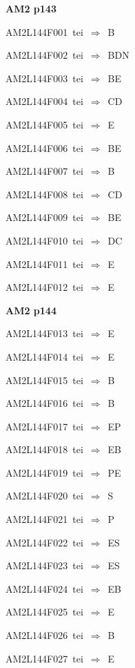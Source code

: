\par\vfill\eject
{\bf\hfill AM2 p143\hfill\hbox{}}\par\bigskip
{\sixrm AM2L144F001\ {\sixit tei}\ }$\Rightarrow$\ {\tenit B}\par\smallskip
{\sixrm AM2L144F002\ {\sixit tei}\ }$\Rightarrow$\ BDN\par\smallskip
{\sixrm AM2L144F003\ {\sixit tei}\ }$\Rightarrow$\ BE\par\smallskip
{\sixrm AM2L144F004\ {\sixit tei}\ }$\Rightarrow$\ CD\par\smallskip
{\sixrm AM2L144F005\ {\sixit tei}\ }$\Rightarrow$\ {\tenit E}\par\smallskip
{\sixrm AM2L144F006\ {\sixit tei}\ }$\Rightarrow$\ BE\par\smallskip
{\sixrm AM2L144F007\ {\sixit tei}\ }$\Rightarrow$\ {\tenit B}\par\smallskip
{\sixrm AM2L144F008\ {\sixit tei}\ }$\Rightarrow$\ CD\par\smallskip
{\sixrm AM2L144F009\ {\sixit tei}\ }$\Rightarrow$\ BE\par\smallskip
{\sixrm AM2L144F010\ {\sixit tei}\ }$\Rightarrow$\ DC\par\smallskip
{\sixrm AM2L144F011\ {\sixit tei}\ }$\Rightarrow$\ {\tenit E}\par\smallskip
{\sixrm AM2L144F012\ {\sixit tei}\ }$\Rightarrow$\ {\tenit E}\par\smallskip

\par\vfill\eject
{\bf\hfill AM2 p144\hfill\hbox{}}\par\bigskip
{\sixrm AM2L144F013\ {\sixit tei}\ }$\Rightarrow$\ E\par\smallskip
{\sixrm AM2L144F014\ {\sixit tei}\ }$\Rightarrow$\ E\par\smallskip
{\sixrm AM2L144F015\ {\sixit tei}\ }$\Rightarrow$\ B\par\smallskip
{\sixrm AM2L144F016\ {\sixit tei}\ }$\Rightarrow$\ B\par\smallskip
{\sixrm AM2L144F017\ {\sixit tei}\ }$\Rightarrow$\ EP\par\smallskip
{\sixrm AM2L144F018\ {\sixit tei}\ }$\Rightarrow$\ EB\par\smallskip
{\sixrm AM2L144F019\ {\sixit tei}\ }$\Rightarrow$\ PE\par\smallskip
{\sixrm AM2L144F020\ {\sixit tei}\ }$\Rightarrow$\ S\par\smallskip
{\sixrm AM2L144F021\ {\sixit tei}\ }$\Rightarrow$\ P\par\smallskip
{\sixrm AM2L144F022\ {\sixit tei}\ }$\Rightarrow$\ ES\par\smallskip
{\sixrm AM2L144F023\ {\sixit tei}\ }$\Rightarrow$\ ES\par\smallskip
{\sixrm AM2L144F024\ {\sixit tei}\ }$\Rightarrow$\ EB\par\smallskip
{\sixrm AM2L144F025\ {\sixit tei}\ }$\Rightarrow$\ E\par\smallskip
{\sixrm AM2L144F026\ {\sixit tei}\ }$\Rightarrow$\ B\par\smallskip
{\sixrm AM2L144F027\ {\sixit tei}\ }$\Rightarrow$\ E\par\smallskip

